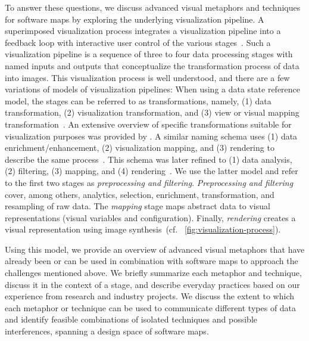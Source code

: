 \documentclass{svjour3}                     %
\def\cf{cf. }
\begin{document}
To answer these questions, we discuss advanced visual metaphors and techniques for software maps by exploring the underlying visualization pipeline.
A superimposed visualization process integrates a visualization pipeline into a feedback loop with interactive user control of the various stages~\citep{wijk2005-visualization}.
Such a visualization pipeline is a sequence of three to four data processing stages with named inputs and outputs that conceptualize the transformation process of data into images.
This visualization process is well understood, and there are a few variations of models of visualization pipelines:
When using a data state reference model, the stages can be referred to as transformations, namely, (1) data transformation, (2) visualization transformation, and (3) view or visual mapping transformation~\citep{chi1998-operator,card1999-readings,chi2000-taxonomy}.
An extensive overview of specific transformations suitable for visualization purposes was provided by \cite{liu2017-advances}.
A similar naming schema uses (1) data enrichment/enhancement, (2) visualization mapping, and (3) rendering to describe the same process~\citep{haber1990-visualization}.
This schema was later refined to (1) data analysis, (2) filtering, (3) mapping, and (4) rendering~\citep{santos2004-gaining}.
We use the latter model and refer to the first two stages as \emph{preprocessing and filtering}.
\emph{Preprocessing and filtering} cover, among others, analytics, selection, enrichment, transformation, and resampling of raw data.
The \emph{mapping} stage maps abstract data to visual representations (visual variables and configuration).
Finally, \emph{rendering} creates a visual representation using image synthesis~(\cf~\autoref{fig:visualization-process}).

Using this model, we provide an overview of advanced visual metaphors that have already been or can be used in combination with software maps to approach the challenges mentioned above. %
We briefly summarize each metaphor and technique, discuss it in the context of a stage, and describe everyday practices based on our experience from research and industry projects.
We discuss the extent to which each metaphor or technique can be used to communicate different types of data and identify feasible combinations of isolated techniques and possible interferences, spanning a design space of software maps.
\end{document}
